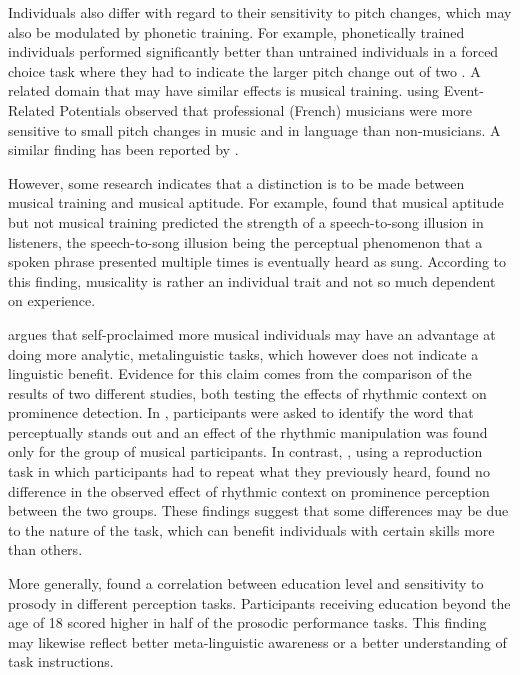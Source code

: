 Individuals also differ with regard to their sensitivity to pitch changes, which may also be modulated by phonetic training. For example, phonetically trained individuals performed significantly better than untrained individuals in a forced choice task where they had to indicate the larger pitch change out of two \citep{thartDifferentialSensitivityPitch1981}. A related domain that may have similar effects is musical training. \citet{schonMusicSpeechMusic2004} using Event-Related Potentials observed that professional (French) musicians were more sensitive to small pitch changes in music and in language than non-musicians. A similar finding has been reported by \citet{thartDifferentialSensitivityPitch1981}.

However, some research indicates that a distinction is to be made between musical training and musical aptitude. For example, \citet{tierneyIndividualDifferencesPerception2021} found that musical aptitude but not musical training predicted the strength of a speech-to-song illusion in listeners, the speech-to-song illusion being the perceptual phenomenon that a spoken phrase presented multiple times is eventually heard as sung. According to this finding, musicality is rather an individual trait and not so much dependent on experience.

\citet{niebuhrF0basedRhythmEffects2009} argues that self-proclaimed more musical individuals may have an advantage at doing more analytic, metalinguistic tasks, which however does not indicate a linguistic benefit. Evidence for this claim comes from the comparison of the results of two different studies, both testing the effects of rhythmic context on prominence detection. In \citet{niebuhrEffectGlobalRhythms2008}, participants were asked to identify the word that perceptually stands out and an effect of the rhythmic manipulation was found only for the group of musical participants. In contrast, \citet{niebuhrF0basedRhythmEffects2009}, using a reproduction task in which participants had to repeat what they previously heard, found no difference in the observed effect of rhythmic context on prominence perception between the two groups. These findings suggest that some differences may be due to the nature of the task, which can benefit individuals with certain skills more than others.

More generally, \citet{peppeProsodicVariationSouthern2000} found a correlation between education level and sensitivity to prosody in different perception tasks. Participants receiving education beyond the age of 18 scored higher in half of the prosodic performance tasks. This finding may likewise reflect better meta-linguistic awareness or a better understanding of task instructions.

